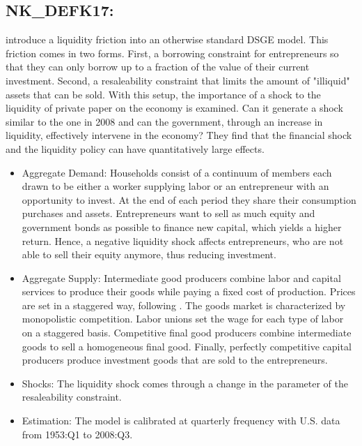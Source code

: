 \documentclass[11pt,a4paper]{article}
\begin{document}
	
	
	\subsection{NK\_DEFK17: \texorpdfstring{\cite{delnegro2017eggertson}}{Del Negro et al. 2017} }
	\label{NKDEFK17}
	
	\cite{delnegro2017eggertson} introduce a liquidity friction into an otherwise standard DSGE model. This friction comes in two forms. First, a borrowing constraint for entrepreneurs so that they can only borrow up to a fraction of the value of their current investment. Second, a resaleability constraint that limits the amount of "illiquid" assets that can be sold. With this setup, the importance of a shock to the liquidity of private paper on the economy is examined. Can it generate a shock similar to the one in 2008 and can the government, through an increase in liquidity, effectively intervene in the economy? They find that the financial shock and the liquidity policy can have quantitatively large effects.
	
	\begin{itemize}
		
		\item Aggregate Demand: Households consist of a continuum of members each drawn to be either a worker supplying labor or an entrepreneur with an opportunity to invest. At the end of each period they share their consumption purchases and assets. Entrepreneurs want to sell as much equity and government bonds as possible to finance new capital, which yields a higher return. Hence, a negative liquidity shock affects entrepreneurs, who are not able to sell their equity anymore, thus reducing investment. 
		
		\item Aggregate Supply: Intermediate good producers combine labor and capital services to produce their goods while paying a fixed cost of production. Prices are set in a staggered way, following \cite{Calvo1983}. The goods market is characterized by monopolistic competition. Labor unions set the wage for each type of labor on a staggered basis. Competitive final good producers combine intermediate goods to sell a homogeneous final good. Finally, perfectly competitive  capital producers produce investment goods that are sold to the entrepreneurs.
		
		\item Shocks: The liquidity shock comes through a change in the parameter of the resaleability constraint.
		
		\item Estimation: The model is calibrated at quarterly frequency with U.S. data from 1953:Q1 to 2008:Q3.
	\end{itemize}
	
\end{document}
